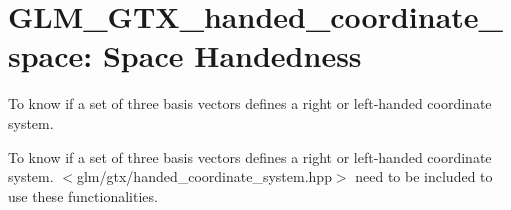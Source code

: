 \hypertarget{group__gtx__handed__coordinate__space}{\section{\-G\-L\-M\-\_\-\-G\-T\-X\-\_\-handed\-\_\-coordinate\-\_\-space\-: \-Space \-Handedness}
\label{group__gtx__handed__coordinate__space}
}


\-To know if a set of three basis vectors defines a right or left-\/handed coordinate system.  


\-To know if a set of three basis vectors defines a right or left-\/handed coordinate system. $<$glm/gtx/handed\-\_\-coordinate\-\_\-system.\-hpp$>$ need to be included to use these functionalities. 